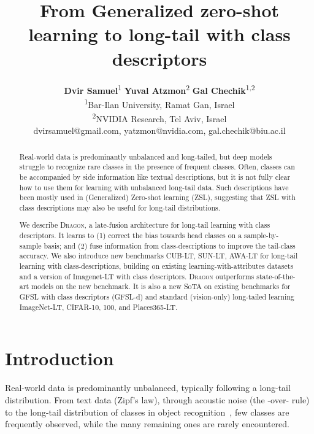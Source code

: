 \documentclass[10pt,twocolumn,letterpaper]{article}
\newcommand{\DRAGON}{\textsc{Dragon}}
\begin{document}
\title{From Generalized zero-shot learning to long-tail with class descriptors} 

\author{\textbf{Dvir Samuel}\textsuperscript{1}
\textbf{Yuval Atzmon}\textsuperscript{2}
\textbf{Gal Chechik}\textsuperscript{1,2} \\
\textsuperscript{1}Bar-Ilan University, Ramat Gan, Israel \\
\textsuperscript{2}NVIDIA Research, Tel Aviv, Israel \\
dvirsamuel@gmail.com, yatzmon@nvidia.com, gal.chechik@biu.ac.il}

\maketitle

\begin{abstract}
Real-world data is predominantly unbalanced and long-tailed, but deep models struggle to recognize rare classes in the presence of frequent classes. Often, classes can be accompanied by side information like textual descriptions, but it is not fully clear how to use them for learning with unbalanced long-tail data. Such descriptions have been mostly used in (Generalized) Zero-shot learning (ZSL), suggesting that ZSL with class descriptions may also be useful for long-tail distributions. 

We describe \DRAGON{}, a late-fusion architecture for long-tail learning with class descriptors.
It learns to (1)  correct the bias towards head classes on a sample-by-sample basis; and (2) fuse information from class-descriptions to improve the tail-class accuracy. We also introduce new benchmarks CUB-LT, SUN-LT, AWA-LT for long-tail learning with class-descriptions, building on existing learning-with-attributes datasets and a version of Imagenet-LT with class descriptors.
\DRAGON{} outperforms state-of-the-art models on the new benchmark. It is also a new SoTA on existing benchmarks for GFSL with class descriptors (GFSL-d) and standard (vision-only) long-tailed learning ImageNet-LT, CIFAR-10, 100, and Places365-LT.
\end{abstract}

\section{Introduction}
\label{sec:intro}
Real-world data is predominantly unbalanced, typically following a long-tail distribution. 
From text data (Zipf's law), through acoustic noise (the -over- rule) to the long-tail distribution of classes in object recognition~\cite{van2017devil}, few classes are frequently observed, while the many remaining ones are rarely encountered. 
\end{document}
